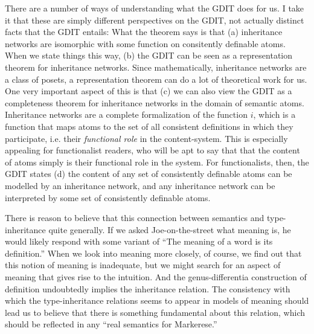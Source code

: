 \documentclass[12pt]{amsart}
\begin{document}
There are a number of ways of understanding what the GDIT does for us. I take it that these are simply different perspectives on the GDIT, not actually distinct facts that the GDIT entails: What the theorem says is that (a) inheritance networks are isomorphic with some function on consitently definable atoms. When we state things this way, (b) the GDIT can be seen as a representation theorem for inheritance networks. Since mathematically, inheritance networks are a class of posets, a representation theorem can do a lot of theoretical work for us. One very important aspect of this is that (c) we can also view the GDIT as a completeness theorem for inheritance networks in the domain of semantic atoms. Inheritance networks are a complete formalization of the function $i$, which is a function that maps atoms to the set of all consistent definitions in which they participate, i.e. their \emph{functional role} in the content-system. This is especially appealing for functionalist readers, who will be apt to say that that the content of atoms simply is their functional role in the system. For functionalists, then, the GDIT states (d) the content of any set of consistently definable atoms can be modelled by an inheritance network, and any inheritance network can be interpreted by some set of consistently definable atoms.

There is reason to believe that this connection between semantics and type-inheritance quite generally. If we asked Joe-on-the-street what meaning is, he would likely respond with some variant of ``The meaning of a word is its definition.'' When we look into meaning more closely, of course, we find out that this notion of meaning is inadequate, but we might search for an aspect of meaning that gives rise to the intuition. And the genus-differentia construction of definition undoubtedly implies the inheritance relation. The consistency with which the type-inheritance relations seems to appear in models of meaning should lead us to believe that there is something fundamental about this relation, which should be reflected in any ``real semantics for Markerese.''
\end{document}
